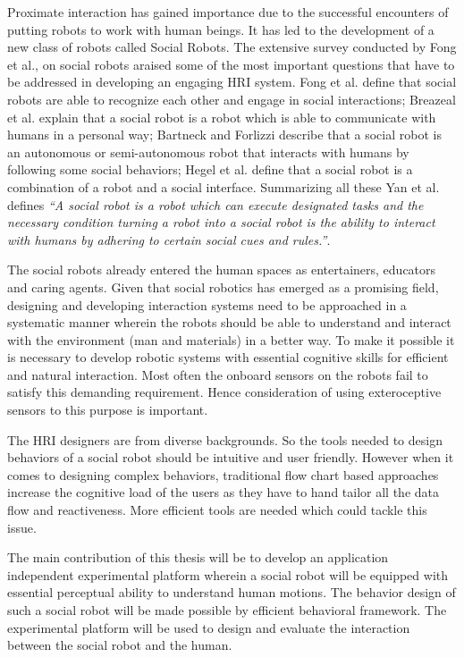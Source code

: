 	Proximate interaction has gained importance due to the successful encounters of putting robots to work with human beings. It has led to the development of a new class of robots called Social Robots. The extensive survey conducted by Fong et al.,\cite{fong2003survey} on social robots araised some of the most important questions that have to be addressed in developing an engaging HRI system. Fong et al. \cite{fong2003survey} define that social robots are able to recognize each other and engage in social interactions; Breazeal et al.\cite{Breazeal:2002:DSR:515422} explain that a social robot is a robot which is able to communicate with humans in a personal way; Bartneck and Forlizzi \cite{bartneck2004design} describe that a social robot is an autonomous or semi-autonomous robot that interacts with humans by following some social behaviors; Hegel et al. \cite{hegel2009understanding} define that a social robot is a combination of a robot and a social interface. Summarizing all these Yan et al. \cite{yan2014survey} defines \emph{“A social robot is a robot which can execute designated tasks and the necessary condition turning a robot into a social robot is the ability to interact with humans by adhering to certain social cues and rules.”}. 
	
	The social robots already entered the human spaces as entertainers, educators\cite{NaoTheRobot} and caring agents\cite{ASKNao}. Given that social robotics has emerged as a promising field, designing and developing interaction systems need to be approached in a systematic manner wherein the robots should be able to understand and interact with the environment (man and materials) in a better way. To make it possible it is necessary to develop robotic systems with essential cognitive skills for efficient and natural interaction. Most often the onboard sensors on the robots fail to satisfy this demanding requirement. Hence consideration of using exteroceptive sensors to this purpose is important.  
	
	The HRI designers are from diverse backgrounds. So the tools needed to design behaviors of a social robot should be intuitive and user friendly. However when it comes to designing complex behaviors, traditional flow chart based approaches\cite{Choregraphe} increase the cognitive load of the users as they have to hand tailor all the data flow and reactiveness. More efficient tools are needed which could tackle this issue. 
	
	The main contribution of this thesis will be to develop an application independent experimental platform wherein a social robot will be equipped with essential perceptual ability to understand human motions. The behavior design of such a social robot will be made possible by efficient behavioral framework. The experimental platform will be used to design and evaluate the interaction between the social robot and the human.	

